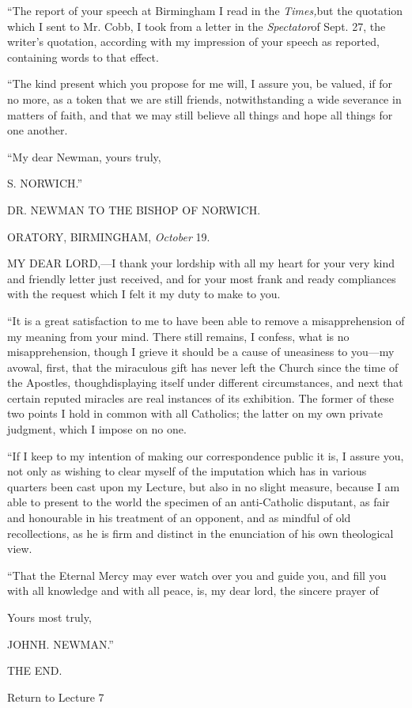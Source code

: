 ``The report of your speech at Birmingham I read
in the \emph{Times,}but the quotation which I sent to
Mr. Cobb, I took from a letter in the \emph{Spectator}of
Sept. 27, the writer's quotation, according with my
impression of your speech as reported, containing words
to that effect.


``The kind present which you propose for me will,
I assure you, be valued, if for no more, as a token that
we are still friends, notwithstanding a wide severance in
matters of faith, and that we may still believe all
things and hope all things for one another.


``My dear Newman, yours truly,

S. NORWICH.''






DR. NEWMAN TO THE BISHOP OF NORWICH.

ORATORY, BIRMINGHAM, \emph{October} 19.

MY DEAR
LORD,—I thank your lordship with all my
heart for your very kind and friendly letter just
received, and for your most frank and ready compliances
with the request which I felt it my duty to make to you.


``It is a great satisfaction to me to have been
able to remove a misapprehension of my meaning from your
mind. There still remains, I confess, what is no
misapprehension, though I grieve it should be a cause of
uneasiness to you—my avowal, first, that the
miraculous gift has never left the Church since the time
of the Apostles, though\emph{}displaying itself under
different circumstances, and next that certain reputed
miracles are real instances of its exhibition. The former
of these two points I hold in common with all Catholics;
the latter on my own private judgment, which I impose on
no one.


``If I keep to my intention of making our
correspondence public it is, I assure you, not only as
wishing to clear myself of the imputation which has in
various quarters been cast upon my Lecture, but also in
no slight measure, because I am able to present to the
world the specimen of an anti-Catholic disputant, as fair
and honourable in his treatment of an opponent, and as
mindful of old recollections, as he is firm and distinct
in the enunciation of his own theological view.


``That the Eternal Mercy may ever watch over you
and guide you, and fill you with all knowledge and with
all peace, is, my dear lord, the sincere prayer of

Yours most truly,

JOHN\emph{}H. NEWMAN.''


THE END.


Return to Lecture 7
